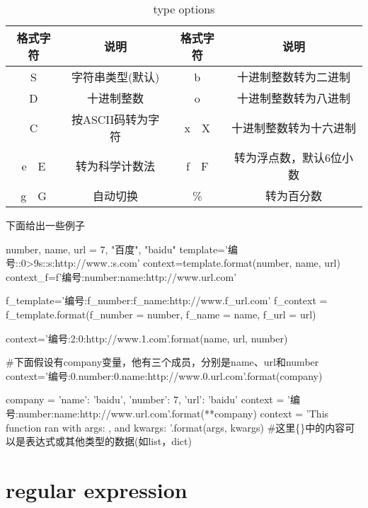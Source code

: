 \documentclass{article}
\begin{document}
        \begin{table}[H]
          \centering
          \caption{type options}
          \label{tab:type options}
          \begin{tabular}{cccc}
            \toprule[1.5pt]
            格式字符 & 说明 & 格式字符 & 说明 \\
            \midrule
            S & 字符串类型(默认) & b & 十进制整数转为二进制 \\
            D & 十进制整数 & o & 十进制整数转为八进制 \\
            C & 按ASCII码转为字符 & x~~X & 十进制整数转为十六进制 \\
            e~~E & 转为科学计数法 & f~~F & 转为浮点数，默认6位小数 \\
            g~~G & 自动切换 & \% & 转为百分数 \\
            \bottomrule[1.5pt]
          \end{tabular}
        \end{table}

        下面给出一些例子
        \begin{codeblock}[language=python, caption={examples of format string}]
          number, name, url = 7, "百度", "baidu"
          template='编号:{:0>9s}:{:s}:http://www.{:s}.com'
          context=template.format(number, name, url)
          context_f=f'编号:{number}:{name}:http://www.{url}.com'

          f_template='编号:{f_number}:{f_name}:http://www.{f_url}.com'
          f_context = f_template.format(f_number = number, f_name = name, f_url = url)

          context='编号:{2}:{0}:http://www.{1}.com'.format(name, url, number)

          #下面假设有company变量，他有三个成员，分别是name、url和number
          context='编号:{0.number}:{0.name}:http://www.{0.url}.com'.format(company)
        
          company = {'name': 'baidu', 'number': 7, 'url': 'baidu'}
          context = '编号:{number}:{name}:http://www.{url}.com'.format(**company)
          context = 'This function ran with args: {}, and kwargs: {}'.format(args, kwargs)
          #这里\{\}中的内容可以是表达式或其他类型的数据(如list，dict)
        \end{codeblock}

  \section{regular expression}
    
\end{document}
